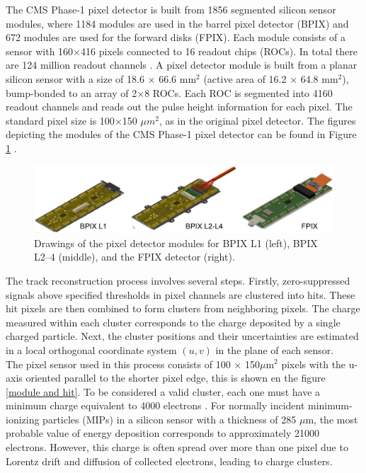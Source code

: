 The CMS Phase-1 pixel detector is built from 1856 segmented silicon sensor modules, where 1184 modules are used in the barrel pixel detector (BPIX) and 672 modules are used for the forward disks (FPIX). Each module consists of a sensor with 160$\times$416 pixels connected to 16 readout chips (ROCs). In total there are 124 million readout channels \cite{phase1_Pixel_Detector}.
A pixel detector module is built from a planar silicon sensor with a size of 18.6 $\times$ 66.6 $\text{mm}^{2}$ (active area of 16.2 $\times$ 64.8 $\text{mm}^{2}$), bump-bonded to an array of 2$\times$8 ROCs. Each ROC is segmented into 4160 readout channels and reads out the pulse height information for each pixel. The standard pixel size is 100$\times$150 $\mu m^{2}$, as in the original pixel detector.
The figures depicting the modules of the CMS Phase-1 pixel detector can be found in Figure \ref{modules_drawing} \cite{phase1_Pixel_Detector}.

\begin{center}
  \begin{figure}[h]
    \centering
    \includegraphics[scale=.2]{Chapter2/modules_drawing.png}
    \caption[Pixel detector modules]{ Drawings of the pixel detector modules for BPIX L1 (left), BPIX L2–4 (middle), and the FPIX detector (right)\cite{phase1_Pixel_Detector}.}
    \label{modules_drawing}
  \end{figure}
\end{center}

The track reconstruction process involves several steps. Firstly, zero-suppressed signals above specified thresholds in pixel channels are clustered into hits. These hit pixels are then combined to form clusters from neighboring pixels. The charge measured within each cluster corresponds to the charge deposited by a single charged particle. Next, the cluster positions and their uncertainties are estimated in a local orthogonal coordinate system $(u,v)$ in the plane of each sensor.\\

The pixel sensor used in this process consists of 100 $\times$ 150$\mu \text{m}^{2}$ pixels with the u-axis oriented parallel to the shorter pixel edge, this is shown en the figure \ref{module and hit}. To be considered a valid cluster, each one must have a minimum charge equivalent to 4000 electrons \cite{Track_Reco_2014,phase1_Pixel_Detector}.
For normally incident minimum-ionizing particles (MIPs) in a silicon sensor with a thickness of 285 $\mu \text{m}$, the most probable value of energy deposition corresponds to approximately 21000 electrons. However, this charge is often spread over more than one pixel due to Lorentz drift and diffusion of collected electrons, leading to charge clusters.\\

